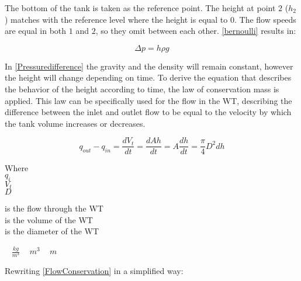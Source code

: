 The bottom of the tank is taken as the reference point. The height at point $2$ ($h_2$) matches with the reference level 
where the height is equal to 0. The flow speeds are equal in both $1$ 
and $2$, so they omit between each other. \eqref{bernoulli} results in: 

\begin{equation}
  \Delta p = h \rho g
  \label{Pressuredifference}
\end{equation}

In \eqref{Pressuredifference} the gravity and the density will remain constant, 
however the height will change depending on time. 
To derive the equation that describes the behavior of the height according to 
time, the law of conservation mass is applied. This law can be specifically used for the flow in the WT, describing the difference between the inlet and outlet flow 
to be equal to the velocity by which the tank volume increases or decreases. 

\begin{equation}
  q_{out} - q_{in} = \frac{dV_t}{dt} = \frac{dAh}{dt} = A \frac{dh}{dt} = \frac{\pi}{4} D^2 {dh}
  \label{FlowConservation}
\end{equation}

\begin{minipage}[t]{0.20\textwidth}
Where\\
\hspace*{8mm} $q_i$ \\
\hspace*{8mm} $V_t$ \\
\hspace*{8mm} $D$ 
\end{minipage}
\begin{minipage}[t]{0.68\textwidth}
\vspace*{2mm}
is the flow through the WT\\
is the volume of the WT\\
is the diameter of the WT 
\end{minipage}
\begin{minipage}[t]{0.10\textwidth}
\vspace*{2mm}
\textcolor{White}{te}$\unit{\frac{kg}{m^3}}$
\textcolor{White}{te}$\unit{m^3}$
\textcolor{White}{te}$\unit{m}$
\end{minipage}

Rewriting \eqref{FlowConservation} in a simplified way:


